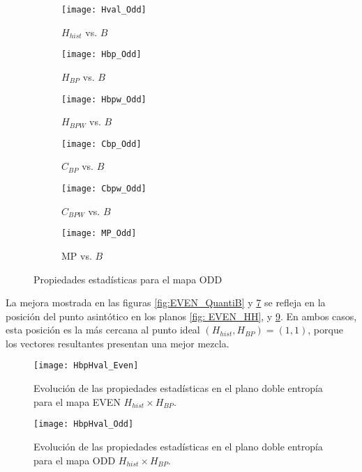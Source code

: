 %
\begin{figure}[htpb]
	\centering
	\begin{subfigure}[b]{0.49\textwidth}
		\texttt{[image: Hval\_Odd]}
		\caption{$H_{hist}$ vs. $B$}
		\label{fig:Hval_Odd}
	\end{subfigure}
	\begin{subfigure}[b]{0.49\textwidth}
		\texttt{[image: Hbp\_Odd]}
		\caption{$H_{BP}$ vs. $B$}
		\label{fig:Hbp_Odd}
	\end{subfigure}
	\begin{subfigure}[b]{0.49\textwidth}
		\texttt{[image: Hbpw\_Odd]}
		\caption{$H_{BPW}$ vs. $B$}
		\label{fig:Hbpw_Odd}
	\end{subfigure}
	\begin{subfigure}[b]{0.49\textwidth}
		\texttt{[image: Cbp\_Odd]}
		\caption{$C_{BP}$ vs. $B$}
		\label{fig:Cbp_Odd}
	\end{subfigure}
	\begin{subfigure}[b]{0.49\textwidth}
		\texttt{[image: Cbpw\_Odd]}
		\caption{$C_{BPW}$ vs. $B$}
		\label{fig:Cbpw_Odd}
	\end{subfigure}
	\begin{subfigure}[b]{0.49\textwidth}
		\texttt{[image: MP\_Odd]}
		\caption{MP vs. $B$}
		\label{fig:MP_Odd}
	\end{subfigure}
	\caption{Propiedades estadísticas para el mapa ODD}
	\label{fig:ODD_QuantiB}
\end{figure}

La mejora mostrada en las figuras \ref{fig:EVEN_QuantiB} y \ref{fig:ODD_QuantiB} se refleja en la posición del punto asintótico en los planos \ref{fig: EVEN_HH}, y \ref{fig:ODD_HH}.
En ambos casos, esta posición es la más cercana al punto ideal $(H_{hist}, H_{BP}) = (1, 1)$, porque los vectores resultantes presentan una mejor mezcla.
%
\begin{figure}[htpb]
	\centering
	\texttt{[image: HbpHval\_Even]}
	\caption{Evolución de las propiedades estadísticas en el plano doble entropía para el mapa EVEN $H_{hist} \times H_{BP}$.}
	\label{fig:EVEN_HH}
\end{figure}
%
\begin{figure}[htpb]
	\centering
	\texttt{[image: HbpHval\_Odd]}
	\caption{Evolución de las propiedades estadísticas en el plano doble entropía para el mapa ODD $H_{hist} \times H_{BP}$.}
	\label{fig:ODD_HH}
\end{figure}

